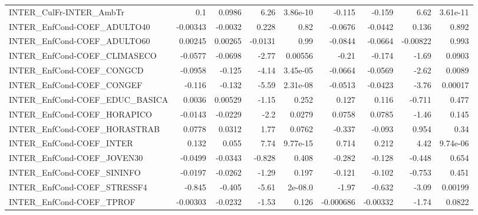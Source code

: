 \begin{tabular}{lrrrrrrrr}
INTER\_CulFr-INTER\_AmbTr               &         0.1 &       0.0986 &    6.26 & 3.86e-10 &     -0.115 &      -0.159 &         6.62 &      3.61e-11 \\
INTER\_EnfCond-COEF\_ADULTO40           &    -0.00343 &      -0.0032 &   0.228 &     0.82 &    -0.0676 &     -0.0442 &        0.136 &         0.892 \\
INTER\_EnfCond-COEF\_ADULTO60           &     0.00245 &      0.00265 & -0.0131 &     0.99 &    -0.0844 &     -0.0664 &     -0.00822 &         0.993 \\
INTER\_EnfCond-COEF\_CLIMASECO          &     -0.0577 &      -0.0698 &   -2.77 &  0.00556 &      -0.21 &      -0.174 &        -1.69 &        0.0903 \\
INTER\_EnfCond-COEF\_CONGCD             &     -0.0958 &       -0.125 &   -4.14 & 3.45e-05 &    -0.0664 &     -0.0569 &        -2.62 &        0.0089 \\
INTER\_EnfCond-COEF\_CONGEF             &      -0.116 &       -0.132 &   -5.59 & 2.31e-08 &    -0.0513 &     -0.0423 &        -3.76 &       0.00017 \\
INTER\_EnfCond-COEF\_EDUC\_BASICA        &      0.0036 &      0.00529 &   -1.15 &    0.252 &      0.127 &       0.116 &       -0.711 &         0.477 \\
INTER\_EnfCond-COEF\_HORAPICO           &     -0.0143 &      -0.0229 &    -2.2 &   0.0279 &     0.0758 &      0.0785 &        -1.46 &         0.145 \\
INTER\_EnfCond-COEF\_HORASTRAB          &      0.0778 &       0.0312 &    1.77 &   0.0762 &     -0.337 &      -0.093 &        0.954 &          0.34 \\
INTER\_EnfCond-COEF\_INTER              &       0.132 &        0.055 &    7.74 & 9.77e-15 &      0.714 &       0.212 &         4.42 &      9.74e-06 \\
INTER\_EnfCond-COEF\_JOVEN30            &     -0.0499 &      -0.0343 &  -0.828 &    0.408 &     -0.282 &      -0.128 &       -0.448 &         0.654 \\
INTER\_EnfCond-COEF\_SININFO            &     -0.0197 &      -0.0262 &   -1.29 &    0.197 &     -0.121 &      -0.102 &       -0.753 &         0.451 \\
INTER\_EnfCond-COEF\_STRESSF4           &      -0.845 &       -0.405 &   -5.61 &  2e-08.0 &      -1.97 &      -0.632 &        -3.09 &       0.00199 \\
INTER\_EnfCond-COEF\_TPROF              &    -0.00303 &      -0.0232 &   -1.53 &    0.126 &  -0.000686 &    -0.00332 &        -1.74 &        0.0822 \\

\end{tabular}
